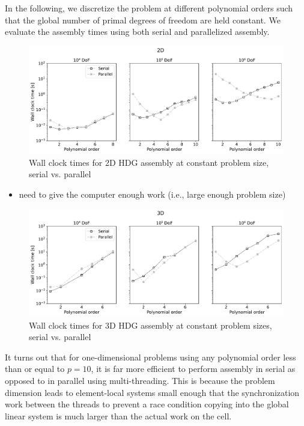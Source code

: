 In the following, we discretize the problem at different polynomial orders such that the global number of primal degrees of freedom are held constant.
We evaluate the assembly times using both serial and parallelized assembly.
\begin{figure}[htpb]
  \centering
  \includegraphics[width=0.8\linewidth]{img/assembly_benchmarking_2D.pdf}
  \caption{Wall clock times for 2D HDG assembly at constant problem size, serial vs. parallel}
  \label{fig:assembly_benchmarking_2D}
\end{figure}

\begin{itemize}
  \item need to give the computer enough work (i.e., large enough problem size)
\end{itemize}

\begin{figure}[htpb]
  \centering
  \includegraphics[width=0.8\linewidth]{img/assembly_benchmarking_3D.pdf}
  \caption{Wall clock times for 3D HDG assembly at constant problem sizes, serial vs. parallel}
  \label{fig:assembly_benchmarking_3D}
\end{figure}


It turns out that for one-dimensional problems using any polynomial order less than or equal to $p=10$, it is far more efficient to perform assembly in serial as opposed to in parallel using multi-threading.
This is because the problem dimension leads to element-local systems small enough that the synchronization work between the threads to prevent a race condition copying into the global linear system is much larger than the actual work on the cell.


